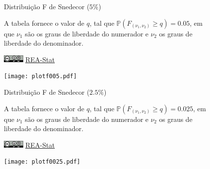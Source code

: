 \documentclass[12pt]{article}
\begin{document}
\newpage


\begin{landscape}

\begin{figure}[h]
\begin{minipage}[c]{1\textwidth}

\begin{Huge}
Distribuição F de Snedecor ($5\%$)
\end{Huge}

\vspace{2em}

A tabela fornece o valor de $q$, tal que $\mathbb{P}(F_{(\nu_1, \nu_2)} \geq q) = 0.05$, em que $\nu_1$ são os graus de liberdade do numerador e $\nu_2$ os graus de liberdade do denominador. 
\par\bigskip
\href{https://creativecommons.org/licenses/by-sa/4.0/deed.pt_BR}{\includegraphics[height=1em]{cc-by-sa.pdf}}
\href{https://rea-stat.github.io}{REA-Stat}
\end{minipage}
\hfill
\begin{minipage}[c]{.34\textwidth}
\texttt{[image: plotf005.pdf]}
\end{minipage}
\end{figure}



\end{landscape}


\newpage


\begin{landscape}

\begin{figure}[h]
\begin{minipage}[c]{1\textwidth}

\begin{Huge}
Distribuição F de Snedecor ($2.5\%$)
\end{Huge}

\vspace{2em}

A tabela fornece o valor de $q$, tal que $\mathbb{P}(F_{(\nu_1, \nu_2)} \geq q) = 0.025$, em que $\nu_1$ são os graus de liberdade do numerador e $\nu_2$ os graus de liberdade do denominador. 
\par\bigskip
\href{https://creativecommons.org/licenses/by-sa/4.0/deed.pt_BR}{\includegraphics[height=1em]{cc-by-sa.pdf}}
\href{https://rea-stat.github.io}{REA-Stat}
\end{minipage}
\hfill
\begin{minipage}[c]{.35\textwidth}
\texttt{[image: plotf0025.pdf]}
\end{minipage}
\end{figure}  



\end{landscape}
\end{document}
